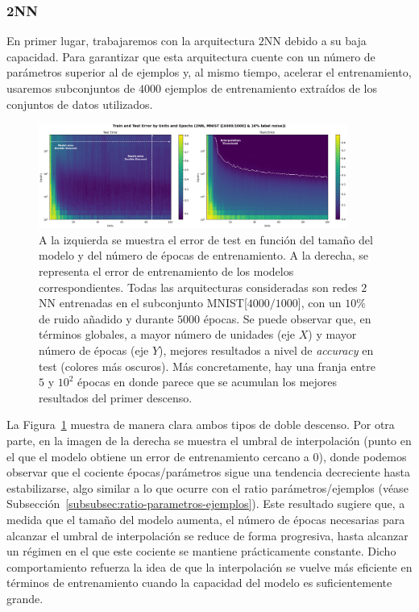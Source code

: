 \subsubsection{2NN}\label{subsubsec:model-epoch-wise-2NN}

En primer lugar, trabajaremos con la arquitectura $2$NN debido a su baja capacidad. Para garantizar que esta arquitectura cuente con un número de parámetros superior al de ejemplos y, al mismo tiempo, acelerar el entrenamiento, usaremos subconjuntos de $4000$ ejemplos de entrenamiento extraídos de los conjuntos de datos utilizados.\newline

\begin{figure}[h]
    \centering
    \includegraphics[width=0.9\textwidth]{img/experiments/model-epoch2NNMNIST.png}
    \caption[Doble descenso en función del tamaño del modelo y del número de épocas para la red $2$NN y un subconjunto de MNIST.]{A la izquierda se muestra el error de test en función del tamaño del modelo y del número de épocas de entrenamiento. A la derecha, se representa el error de entrenamiento de los modelos correspondientes. Todas las arquitecturas consideradas son redes $2$NN entrenadas en el subconjunto MNIST[$4000/1000$], con un $10\%$ de ruido añadido y durante $5000$ épocas. Se puede observar que, en términos globales, a mayor número de unidades (eje $X$) y mayor número de épocas (eje $Y$), mejores resultados a nivel de \textit{accuracy} en test (colores más oscuros). Más concretamente, hay una franja entre $5$ y $10^2$ épocas en donde parece que se acumulan los mejores resultados del primer descenso.}\label{fig:model-epoch2NNMNIST}
\end{figure}

La Figura~\ref{fig:model-epoch2NNMNIST} muestra de manera clara ambos tipos de doble descenso. Por otra parte, en la imagen de la derecha se muestra el umbral de interpolación (punto en el que el modelo obtiene un error de entrenamiento cercano a $0$), donde podemos observar que el cociente épocas/parámetros sigue una tendencia decreciente hasta estabilizarse, algo similar a lo que ocurre con el ratio parámetros/ejemplos (véase Subsección~\ref{subsubsec:ratio-parametros-ejemplos}). Este resultado sugiere que, a medida que el tamaño del modelo aumenta, el número de épocas necesarias para alcanzar el umbral de interpolación se reduce de forma progresiva, hasta alcanzar un régimen en el que este cociente se mantiene prácticamente constante. Dicho comportamiento refuerza la idea de que la interpolación se vuelve más eficiente en términos de entrenamiento cuando la capacidad del modelo es suficientemente grande.\newline

